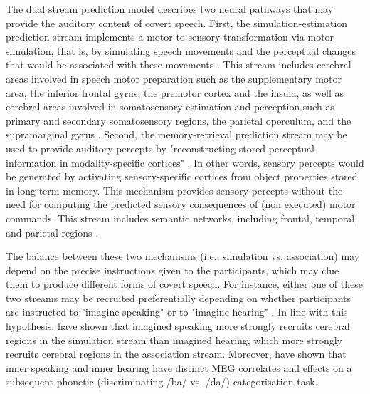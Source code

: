 \documentclass[utf8]{template/frontiersSCNS} %
\begin{document}
The dual stream prediction model \citep{tian_mental_2012, tian_effect_2013, tian_mental_2016} describes two neural pathways that may provide the auditory content of covert speech. First, the simulation-estimation prediction stream implements a motor-to-sensory transformation via motor simulation, that is, by simulating speech movements and the perceptual changes that would be associated with these movements \citep[see also][for a similar proposal]{loevenbruck_cognitive_2018}. This stream includes cerebral areas involved in speech motor preparation such as the supplementary motor area, the inferior frontal gyrus, the premotor cortex and the insula, as well as cerebral areas involved in somatosensory estimation and perception such as primary and secondary somatosensory regions, the parietal operculum, and the supramarginal gyrus \citep{tian_mental_2016}. Second, the memory-retrieval prediction stream may be used to provide auditory percepts by "reconstructing stored perceptual information in modality-specific cortices" \citep{tian_mental_2016}. In other words, sensory percepts would be generated by activating sensory-specific cortices from object properties stored in long-term memory. This mechanism provides sensory percepts without the need for computing the predicted sensory consequences of (non executed) motor commands. This stream includes semantic networks, including frontal, temporal, and parietal regions \citep[for more details, see][]{tian_mental_2016}.


The balance between these two mechanisms (i.e., simulation vs. association) may depend on the precise instructions given to the participants, which may clue them to produce different forms of covert speech. For instance, either one of these two streams may be recruited preferentially depending on whether participants are instructed to "imagine speaking" or to "imagine hearing" \citep[see also the distinction between the "inner ear" and the "inner voice", e.g.,][]{smith_subvocalization_1992}. In line with this hypothesis, \cite{tian_mental_2016} have shown that imagined speaking more strongly recruits cerebral regions in the simulation stream than imagined hearing, which more strongly recruits cerebral regions in the association stream. Moreover, \cite{ma_distinct_2019} have shown that inner speaking and inner hearing have distinct MEG correlates and effects on a subsequent phonetic (discriminating /ba/ vs. /da/) categorisation task.
\end{document}
